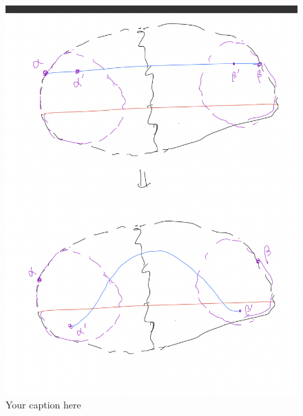 \begin{figure}[H] %
    \centering
    \includegraphics[width=\linewidth]{diagrams/definition5/2.png} %
    \caption{Your caption here}
    \label{fig:your-label}
\end{figure}

